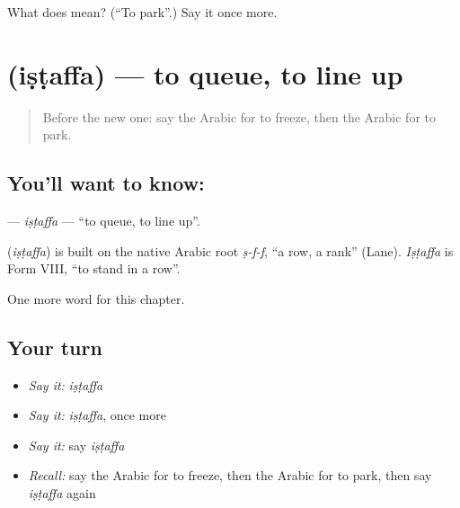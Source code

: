 \begin{tcolorbox}[breakable,colback=teal!4,colframe=teal!35!black,title={Before you move on}]
What does  mean? (\textquotedblleft{}To park\textquotedblright{}.) Say it once more.
\end{tcolorbox}
\section[\texorpdfstring{\ar{اصطف} (iṣṭaffa)}{اصطف (iṣṭaffa)}]{ (iṣṭaffa) — to queue, to line up}

\label{lesson:AR-C261-istaffa}



\begin{quote}
Before the new one: say the Arabic for to freeze, then the Arabic for to park.
\end{quote}

\subsection*{You'll want to know: }
\textbf{} — \emph{iṣṭaffa} — \textquotedblleft{}to queue, to line up\textquotedblright{}.

\begin{cousinweb}
\textbf{} (\emph{iṣṭaffa}) is built on the native Arabic root \emph{ṣ-f-f}, \textquotedblleft{}a row, a rank\textquotedblright{} (Lane). \emph{Iṣṭaffa} is Form VIII, \textquotedblleft{}to stand in a row\textquotedblright{}.
\end{cousinweb}

\begin{grammarlens}[title={What you've built}]
One more word for this chapter.
\end{grammarlens}

\subsection*{Your turn}
\begin{itemize}
\raggedright
  \item \emph{Say it:} \emph{iṣṭaffa}
  \item \emph{Say it:} \emph{iṣṭaffa}, once more
  \item \emph{Say it:} say \emph{iṣṭaffa}
  \item \emph{Recall:} say the Arabic for to freeze, then the Arabic for to park, then say \emph{iṣṭaffa} again
\end{itemize}


